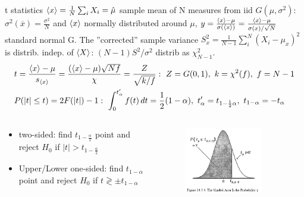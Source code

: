 \documentclass[asd-beamer.tex]{subfiles}%
\begin{document}
\begin{frame}{t statistics}
$\langle x \rangle=\frac{1}{N}\sum_iX_i=\hat{\mu}$ sample mean of N measures from iid $G(\mu,\sigma^2)$: $\sigma^2(\overline{x})=\frac{\sigma^2}{N}$ and $\langle x \rangle$ normally distributed around $\mu$, $y=\frac{\langle x \rangle-\mu}{\sigma(\langle x \rangle)}=\frac{\langle x \rangle-\mu}{\sigma(x)/\sqrt{N}}$ standard normal G. The ''corrected'' sample variance $S_x^2=\frac{1}{N-1}\sum_i^N(X_i-\mu_x)^2$ is distrib. indep. of $\langle X \rangle$: $(N-1)S^2/\sigma^2$ distrib as $\chi^2_{N-1}$.
\begin{align*}
&t=\frac{\exv{x}-\mu}{s_{\exv{x}}}=\frac{(\exv{x}-\mu)\sqrt{Nf}}{\chi}=\frac{Z}{\sqrt{k/f}}:\ Z=G(0,1),\ k=\chi^2(f),\ f=N-1\\
&P(|t|\leq t)=2F(|t|)-1:\ \int_0^{t_{\alpha}'}f(t)\,dt=\frac{1}{2}(1-\alpha),\ t_{\alpha}'=t_{1-\frac{1}{2}\alpha},\ t_{1-\alpha}=-t_{\alpha}
\end{align*}
\begin{columns}[T]
\begin{column}{0.6\textwidth}
\begin{itemize}
	\item two-sided: find $t_{1-\frac{\alpha}{2}}$ point and reject $H_0$ if $|t|>t_{1-\frac{\alpha}{2}}$
	\item Upper/Lower one-sided: find $t_{1-\alpha}$ point and reject $H_0$ if $t\gtrless \pm t_{1-\alpha}$
\end{itemize}
\end{column}
\begin{column}{0.4\textwidth}
	\begin{figure}[!ht]\includegraphics[trim={0cm 0cm 0 0},clip, keepaspectratio,width=0.8\textwidth]{figures/mukhopadhyay/tests/studenttpercpoint}\label{fig:studenttpercpoint}
	\end{figure}
\end{column}
\end{columns}
\end{frame}
\end{document}
